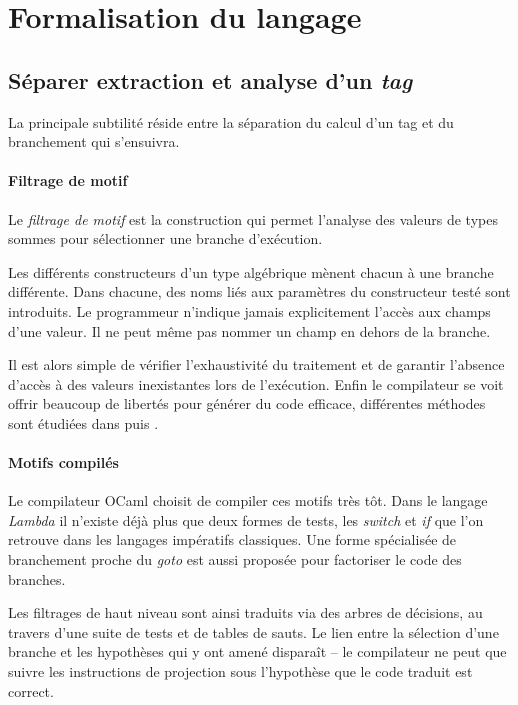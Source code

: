 \section{Formalisation du langage}

\subsection{Séparer extraction et analyse d'un \emph{tag}}

La principale subtilité réside entre la séparation du calcul d'un tag et du
branchement qui s'ensuivra.

\paragraph{Filtrage de motif} Le \emph{filtrage de motif} est la construction
qui permet l'analyse des valeurs de types sommes pour sélectionner une branche
d'exécution.

Les différents constructeurs d'un type algébrique mènent chacun à une branche
différente. Dans chacune, des noms liés aux paramètres du constructeur
testé sont introduits. Le programmeur n'indique jamais explicitement l'accès
aux champs d'une valeur. Il ne peut même pas nommer un champ en dehors de la
branche.

Il est alors simple de vérifier l'exhaustivité du traitement et de garantir
l'absence d'accès à des valeurs inexistantes lors de l'exécution. Enfin le
compilateur se voit offrir beaucoup de libertés pour générer du code efficace,
différentes méthodes sont étudiées dans \cite{LeFessant:2001:OPM:507669.507641}
puis \cite{Maranget:2008:CPM:1411304.1411311}.

\paragraph{Motifs compilés} Le compilateur OCaml choisit de compiler ces motifs
très tôt. Dans le langage \emph{Lambda} il n'existe déjà plus que deux formes
de tests, les \emph{switch} et \emph{if} que l'on retrouve dans les langages
impératifs classiques. Une forme spécialisée de branchement proche du
\emph{goto} est aussi proposée pour factoriser le code des branches.

Les filtrages de haut niveau sont ainsi traduits via des arbres de décisions,
au travers d'une suite de tests et de tables de sauts.  Le lien entre la
sélection d'une branche et les hypothèses qui y ont amené disparaît -- le
compilateur ne peut que suivre les instructions de projection sous l'hypothèse
que le code traduit est correct.

